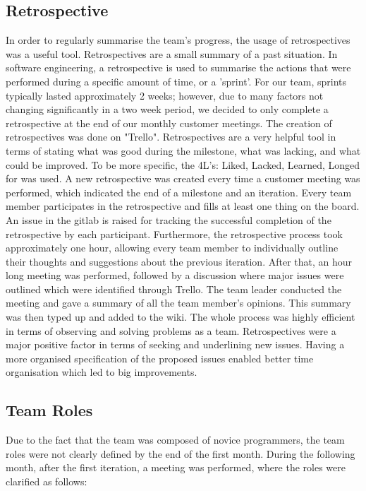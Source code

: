 \documentclass{l3proj}
\begin{document}
\subsection{Retrospective}
\label{retrospective}

In order to regularly summarise the team's progress, the usage of retrospectives was a useful tool. Retrospectives are a small summary of a past situation. In software engineering, a retrospective is used to summarise the actions that were performed during a specific amount of time, or a 'sprint'. For our team, sprints typically lasted approximately 2 weeks; however, due to many factors not changing significantly in a two week period, we decided to only complete a retrospective at the end of our monthly customer meetings. The creation of retrospectives was done on "Trello". Retrospectives are a very helpful tool in terms of stating what was good during the milestone, what was lacking, and what could be improved. To be more specific, the 4L's: Liked, Lacked, Learned, Longed for was used. A new retrospective was created every time a customer meeting was performed, which indicated the end of a milestone and an iteration. Every team member participates in the retrospective and fills at least one thing on the board. An issue in the gitlab is raised for tracking the successful completion of the retrospective by each participant. Furthermore, the retrospective process took approximately one hour, allowing every team member to individually outline their thoughts and suggestions about the previous iteration. After that, an hour long meeting was performed, followed by a discussion where major issues were outlined which were identified through Trello. The team leader conducted the meeting and gave a summary of all the team member's opinions. This summary was then typed up and added to the wiki. The whole process was highly efficient in terms of observing and solving problems as a team. Retrospectives were a major positive factor in terms of seeking and underlining new issues. Having a more organised specification of the proposed issues enabled better time organisation which led to big improvements.

\subsection{Team Roles}
\label{roles}

Due to the fact that the team was composed of novice programmers, the team roles were not clearly defined by the end of the first month. During the following month, after the first iteration, a meeting was performed, where the roles were clarified as follows:
\end{document}

